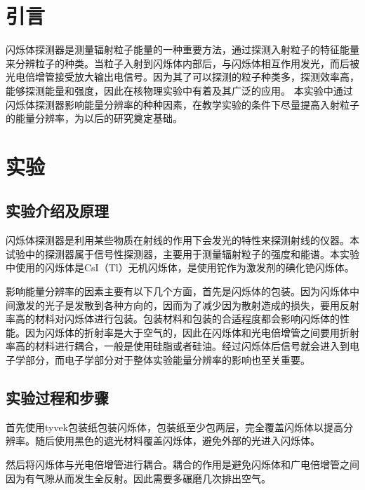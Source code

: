 \documentclass[a4paper,10.0pt,twoside]{npr}
\begin{document}
\begin{multicols}{2}

\section{引言}    %
\vspace*{-1mm}
\song\wuhao

闪烁体探测器是测量辐射粒子能量的一种重要方法，通过探测入射粒子的特征能量来分辨粒子的种类。当粒子入射到闪烁体内部后，与闪烁体相互作用发光，而后被光电倍增管接受放大输出电信号。因为其了可以探测的粒子种类多，探测效率高，能够探测能量和强度，因此在核物理实验中有着及其广泛的应用。
本实验中通过闪烁体探测器影响能量分辨率的种种因素，在教学实验的条件下尽量提高入射粒子的能量分辨率，为以后的研究奠定基础。

\section{实验}
\subsection{实验介绍及原理}
闪烁体探测器是利用某些物质在射线的作用下会发光的特性来探测射线的仪器。本试验中的探测器属于信号性探测器，主要用于测量辐射粒子的强度和能谱。本实验中使用的闪烁体是CsI（Tl）无机闪烁体，是使用铊作为激发剂的碘化铯闪烁体。

影响能量分辨率的因素主要有以下几个方面，首先是闪烁体的包装。因为闪烁体中间激发的光子是发散到各种方向的，因而为了减少因为散射造成的损失，要用反射率高的材料对闪烁体进行包装。包装材料和包装的合适程度都会影响闪烁体的性能。因为闪烁体的折射率是大于空气的，因此在闪烁体和光电倍增管之间要用折射率高的材料进行耦合，一般是使用硅脂或者硅油。经过闪烁体后信号就会进入到电子学部分，而电子学部分对于整体实验能量分辨率的影响也至关重要。

\subsection{实验过程和步骤}

首先使用tyvek包装纸包装闪烁体，包装纸至少包两层，完全覆盖闪烁体以提高分辨率。随后使用黑色的遮光材料覆盖闪烁体，避免外部的光进入闪烁体。

然后将闪烁体与光电倍增管进行耦合。耦合的作用是避免闪烁体和广电倍增管之间因为有气隙从而发生全反射。因此需要多碾磨几次排出空气。


\end{multicols}
\end{document}
